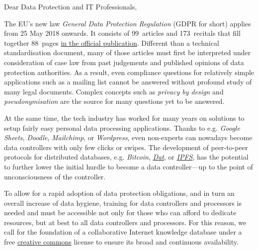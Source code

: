 \documentclass{scrlttr2}
\begin{document}



\begin{letter}{}
\opening{Dear Data Protection and IT Professionals,}


The EU's new law \emph{General Data Protection Regulation} (GDPR for
short) applies from 25 May 2018 onwards. It consists of 99~articles and
173~recitals that fill together 88~pages
\href{http://eur-lex.europa.eu/legal-content/EN/TXT/?uri=uriserv:OJ.L_.2016.119.01.0001.01.ENG}{in
the official publication}. Different than a technical standardisation
document, many of those articles must first be interpreted under consideration of
case law from past judgements and published opinions of data protection
authorities. As a result, even compliance questions for relatively
simple applications such as a mailing list cannot be answered without
profound study of many legal documents. Complex concepts such as
\emph{privacy by design} and \emph{pseudonymisation} are the source for
many questions yet to be answered.

At the same time, the tech industry has worked for many years on
solutions to setup fairly easy personal data processing applications.
Thanks to e.g. \emph{Google Sheets}, \emph{Doodle}, \emph{Mailchimp}, or
\emph{Wordpress}, even non-experts can nowadays become data controllers
with only few clicks or swipes. The development of peer-to-peer
protocols for distributed databases, e.g. \emph{Bitcoin},
\emph{\href{https://datproject.org/}{Dat}}, or
\emph{\href{https://ipfs.io/}{IPFS}}, has the potential to further lower
the initial hurdle to become a data controller---up to the point of
unconsciousness of the controller.

To allow for a rapid adoption of data protection obligations, and in
turn an overall increase of data hygiene, training for data controllers
and processors is needed and must be accessible not only for those who
can afford to dedicate resources, but at best to all data controllers
and processors. For this reason, we call for the foundation of a
collaborative Internet knowledge database under a free
\href{https://creativecommons.org/}{creative commons} license to ensure
its broad and continuous availability.


\end{letter}
\end{document}
